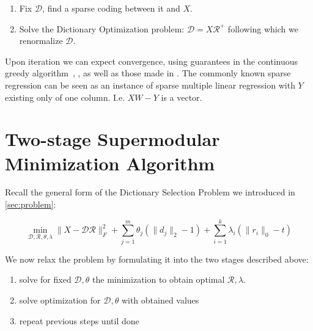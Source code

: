 \documentclass{article}
\newcommand{\Rr}{\mathcal{R}}
\newcommand{\D}{\mathcal{D}}
\begin{document}
\begin{enumerate}
\item Fix $\D$, find a sparse coding between it and $X$.
\item Solve the Dictionary Optimization problem: $\D = X\Rr^{+}$ following which we renormalize $\D$.
\end{enumerate}
Upon iteration we can expect convergence, using guarantees in the continuous greedy algorithm~\cite{greedy_selection}, \cite{submod_spectral}, \cite{submod_sparsecoding} as well as those made in \cite{weaklyalpha}. The commonly known sparse regression can be seen as an instance of sparse multiple linear regression with $Y$ existing only of one column. I.e. $XW-Y$ is a vector. 

\section{Two-stage Supermodular Minimization Algorithm}\label{sec:algorithm}

Recall the general form of the Dictionary Selection Problem we introduced in \autoref{sec:problem}:

$$\min_{\D, \Rr, \theta, \lambda} \|X  -\D\Rr\|_F^2 + \sum_{j=1}^m \theta_j (\| d_j\|_2 - 1)+ \sum_{i=1}^k \lambda_i (\| r_i \|_0 - t)$$

\noindent We now relax the problem by formulating it into the two stages described above:
\begin{enumerate}
\item solve for fixed $\D, \theta$ the minimization to obtain optimal $\Rr, \lambda$.
\item solve optimization for $\D, \theta$ with obtained values
\item repeat previous steps until done
\end{enumerate}
\end{document}
